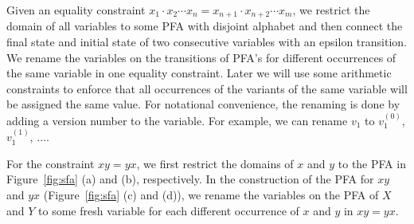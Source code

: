 \documentclass[sigplan,review,anonymous]{acmart}\settopmatter{printfolios=true,printccs=false,printacmref=false}
\begin{document}
Given an equality constraint $x_1\cdot x_2 \cdots x_n = x_{n+1}\cdot x_{n+2} \cdots x_m$, we restrict the domain of all variables to some PFA with disjoint alphabet and then connect the final state and initial state of two consecutive variables with an epsilon transition. We rename the variables on the transitions of PFA's for different occurrences of the same variable in one equality constraint. Later we will use some arithmetic constraints to enforce that all occurrences of the variants of the same variable will be assigned the same value. For notational convenience, the renaming is done by adding a version number to the variable. For example, we can rename $v_1$ to $v_1^{(0)}$, $v_1^{(1)}$, $\ldots$.

For the constraint $xy = yx$, we first restrict the domains of $x$ and $y$ to the PFA in Figure~\ref{fig:sfa} (a) and (b), respectively. In the construction of the PFA for $xy$ and $yx$ (Figure~\ref{fig:sfa} (c) and (d)), we rename the variables on the PFA of $X$ and $Y$ to some fresh variable for each different occurrence of $x$ and $y$ in $xy = yx$.
\end{document}
